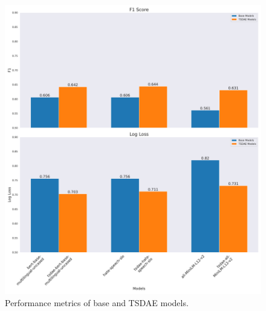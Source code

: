 \documentclass[fleqn,moreauthors,10pt]{ds_report}
\begin{document}
\begin{figure}[h]
    \centering
    \includegraphics[width=1\linewidth]{tsdae_base.pdf}
    \caption{Performance metrics of base and TSDAE models.}
    \label{fig:tsdae_performance}
\end{figure}



    
\end{document}

